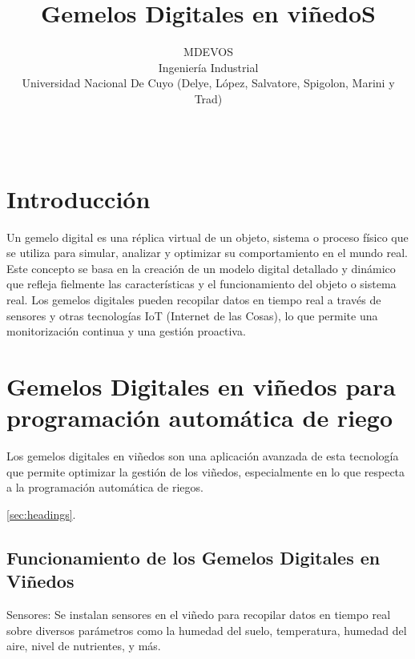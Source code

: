 \documentclass{article}
\title{Gemelos Digitales en viñedoS}
\author{
    MDEVOS
   \\
    Ingeniería Industrial \\
    Universidad Nacional De Cuyo (Delye, López, Salvatore, Spigolon,
Marini y Trad) \\
   \\
  \texttt{} \\
  }
\begin{document}
\maketitle


\begin{abstract}

\end{abstract}


\hypertarget{introducciuxf3n}{%
\section{Introducción}\label{introducciuxf3n}}

Un gemelo digital es una réplica virtual de un objeto, sistema o proceso
físico que se utiliza para simular, analizar y optimizar su
comportamiento en el mundo real. Este concepto se basa en la creación de
un modelo digital detallado y dinámico que refleja fielmente las
características y el funcionamiento del objeto o sistema real. Los
gemelos digitales pueden recopilar datos en tiempo real a través de
sensores y otras tecnologías IoT (Internet de las Cosas), lo que permite
una monitorización continua y una gestión proactiva.

\hypertarget{gemelos-digitales-en-viuxf1edos-para-programaciuxf3n-automuxe1tica-de-riego}{%
\section{Gemelos Digitales en viñedos para programación automática de
riego}\label{gemelos-digitales-en-viuxf1edos-para-programaciuxf3n-automuxe1tica-de-riego}}

Los gemelos digitales en viñedos son una aplicación avanzada de esta
tecnología que permite optimizar la gestión de los viñedos,
especialmente en lo que respecta a la programación automática de riegos.

\label{sec:headings}

\ref{sec:headings}.

\hypertarget{funcionamiento-de-los-gemelos-digitales-en-viuxf1edos}{%
\subsection{Funcionamiento de los Gemelos Digitales en
Viñedos}\label{funcionamiento-de-los-gemelos-digitales-en-viuxf1edos}}

Sensores: Se instalan sensores en el viñedo para recopilar datos en
tiempo real sobre diversos parámetros como la humedad del suelo,
temperatura, humedad del aire, nivel de nutrientes, y más.
\end{document}
